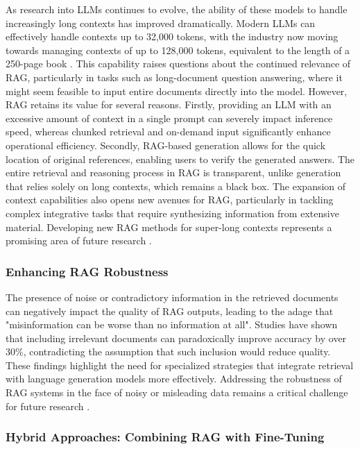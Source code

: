As research into LLMs continues to evolve, the ability of these models to handle increasingly long contexts has improved dramatically. Modern LLMs can effectively handle contexts up to 32,000 tokens, with the industry now moving towards managing contexts of up to 128,000 tokens, equivalent to the length of a 250-page book \cite{ibm2023}. This capability raises questions about the continued relevance of RAG, particularly in tasks such as long-document question answering, where it might seem feasible to input entire documents directly into the model. However, RAG retains its value for several reasons. Firstly, providing an LLM with an excessive amount of context in a single prompt can severely impact inference speed, whereas chunked retrieval and on-demand input significantly enhance operational efficiency. Secondly, RAG-based generation allows for the quick location of original references, enabling users to verify the generated answers. The entire retrieval and reasoning process in RAG is transparent, unlike generation that relies solely on long contexts, which remains a black box. The expansion of context capabilities also opens new avenues for RAG, particularly in tackling complex integrative tasks that require synthesizing information from extensive material. Developing new RAG methods for super-long contexts represents a promising area of future research \cite{gao2023retrieval}.

\subsubsection{Enhancing RAG Robustness}

The presence of noise or contradictory information in the retrieved documents can negatively impact the quality of RAG outputs, leading to the adage that "misinformation can be worse than no information at all". Studies have shown that including irrelevant documents can paradoxically improve accuracy by over 30\%, contradicting the assumption that such inclusion would reduce quality. These findings highlight the need for specialized strategies that integrate retrieval with language generation models more effectively. Addressing the robustness of RAG systems in the face of noisy or misleading data remains a critical challenge for future research \cite{cuconasu2024power}.

\subsubsection{Hybrid Approaches: Combining RAG with Fine-Tuning}


